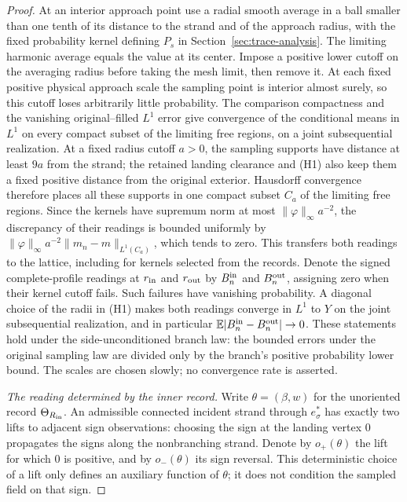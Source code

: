 \begin{proof}
At an interior approach point use a radial smooth average in a ball
smaller than one tenth of its distance to the strand and of the
approach radius, with the fixed probability kernel defining $P_s$ in
Section~\ref{sec:trace-analysis}. The limiting harmonic average equals
the value at its center. Impose a positive lower cutoff on the averaging radius
before taking the mesh limit, then remove it. At each fixed positive
physical approach scale the sampling point is interior almost surely,
so this cutoff loses arbitrarily little probability. The comparison
compactness and the vanishing original--filled $L^1$ error give
convergence of the conditional means in $L^1$ on every compact subset
of the limiting free regions, on a joint subsequential realization.
At a fixed radius cutoff $a>0$, the sampling supports have distance
at least $9a$ from the strand; the retained landing clearance and (H1)
also keep them a fixed positive distance from the original exterior.
Hausdorff convergence therefore places all these supports in one
compact subset $C_a$ of the limiting free regions. Since the kernels
have supremum norm at most $\|\varphi\|_\infty a^{-2}$, the discrepancy
of their readings is bounded uniformly by
$\|\varphi\|_\infty a^{-2}\|m_n-m\|_{L^1(C_a)}$, which tends to zero.
This transfers both readings to the lattice, including for kernels
selected from the records.
Denote the signed complete-profile readings at $r_{\rm in}$ and
$r_{\rm out}$ by $B_n^{\rm in}$ and $B_n^{\rm out}$, assigning zero
when their kernel cutoff fails. Such failures have vanishing probability.
A diagonal choice of the radii in (H1) makes both readings converge in
$L^1$ to $Y$ on the joint subsequential realization, and in particular
$\mathbb E|B_n^{\rm in}-B_n^{\rm out}|\to0$. These statements hold under the
side-unconditioned branch law: the bounded errors under the original
sampling law are divided only by the branch's positive probability
lower bound. The scales are chosen slowly; no convergence rate is asserted.

\emph{The reading determined by the inner record.}
Write $\theta=(\beta,w)$ for the unoriented record
$\Theta_{R_{\rm in}}$. An admissible connected incident strand through
$e_\sigma^*$ has exactly two lifts to adjacent sign observations:
choosing the sign at the landing vertex $0$ propagates the signs along
the nonbranching strand. Denote by $o_+(\theta)$ the lift for which $0$
is positive, and by $o_-(\theta)$ its sign reversal. This deterministic
choice of a lift only defines an auxiliary function of $\theta$; it
does not condition the sampled field on that sign.


\end{proof}
